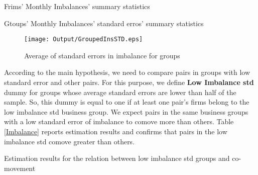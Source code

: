 	{\begin{table}[htbp]
		\centering
		\caption{Frims' Monthly Imbalances' summary statistics}
		\resizebox{0.75\textwidth}{!}{
			
		}
		\label{tab:ImbalanceInsMeanSummary}%
	\end{table}}
	{\begin{table}[htbp]
		\centering
		\caption{Gtoups' Monthly Imbalances' standard erros' summary statistics}
		\resizebox{0.75\textwidth}{!}{
			
		}
		\label{tab:ImbalanceInsStdSummary}%
\end{table}}
	\begin{figure}[htbp]
		\centering
		\texttt{[image: Output/GroupedInsSTD.eps]}
				\caption{Average of standard errors in imbalance for groups}
		\label{fig:GroupedInsSTD}
	\end{figure}
	
	According to the main hypothesis, we need to compare pairs in groups with low standard error and other pairs. For this purpose, we define \textbf{Low Imbalance std} dummy for groups whose average standard errors are lower than half of the sample. So, this dummy is equal to one if at least one pair's firms belong to the low imbalance std business group. We expect pairs in the same business groups with a low standard error of imbalance to comove more than others. Table \ref{Imbalance} reports estimation results and confirms that pairs in the low imbalance std comove greater than others. 
	
		{\begin{table}[htbp]
			\centering
			\caption{Estimation results for the relation between low imbalance std groups and co-movement}
			\label{Imbalance}
			\resizebox{\textwidth}{!}{
				
			}
	\end{table}}

